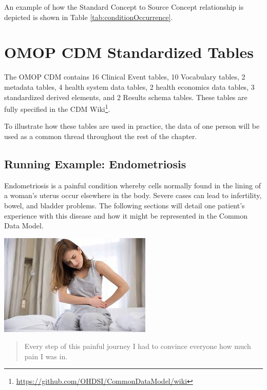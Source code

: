 \documentclass[11pt]{book}
\let\rmarkdownfootnote\footnote%
\def\footnote{\protect\rmarkdownfootnote}
\theoremstyle{definition}
\theoremstyle{definition}
\theoremstyle{definition}
\theoremstyle{remark}
\begin{document}
An example of how the Standard Concept to Source Concept relationship is depicted is shown in Table \ref{tab:conditionOccurrence}.

\hypertarget{omop-cdm-standardized-tables}{%
\section{OMOP CDM Standardized Tables}\label{omop-cdm-standardized-tables}}


The OMOP CDM contains 16 Clinical Event tables, 10 Vocabulary tables, 2 metadata tables, 4 health system data tables, 2 health economics data tables, 3 standardized derived elements, and 2 Results schema tables. These tables are fully specified in the CDM Wiki\footnote{\url{https://github.com/OHDSI/CommonDataModel/wiki}}.

To illustrate how these tables are used in practice, the data of one person will be used as a common thread throughout the rest of the chapter.

\hypertarget{running-example-endometriosis}{%
\subsection{Running Example: Endometriosis}\label{running-example-endometriosis}}

Endometriosis is a painful condition whereby cells normally found in the lining of a woman's uterus occur elsewhere in the body. Severe cases can lead to infertility, bowel, and bladder problems. The following sections will detail one patient's experience with this disease and how it might be represented in the Common Data Model.

\begin{center}\includegraphics[width=0.5\linewidth]{images/CommonDataModel/Lauren} \end{center}

\begin{quote}
Every step of this painful journey I had to convince everyone how much pain I was in.
\end{quote}
\end{document}
